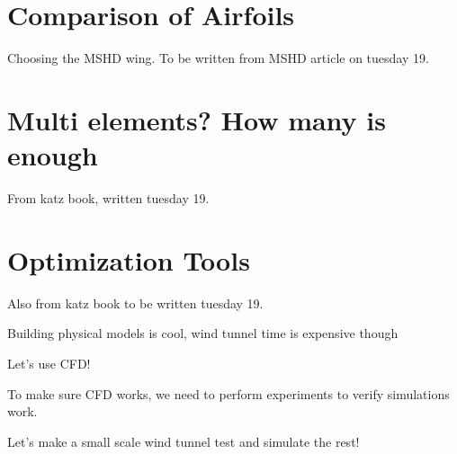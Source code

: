 
\section{Comparison of Airfoils}
Choosing the MSHD wing.
To be written from MSHD article on tuesday 19.

\section{Multi elements? How many is enough}
From katz book, written tuesday 19.

\section{Optimization Tools}

Also from katz book to be written tuesday 19.

Building physical models is cool, wind tunnel time is expensive though

Let's use CFD!

To make sure CFD works, we need to perform experiments to verify simulations work.

Let's make a small scale wind tunnel test and simulate the rest!
